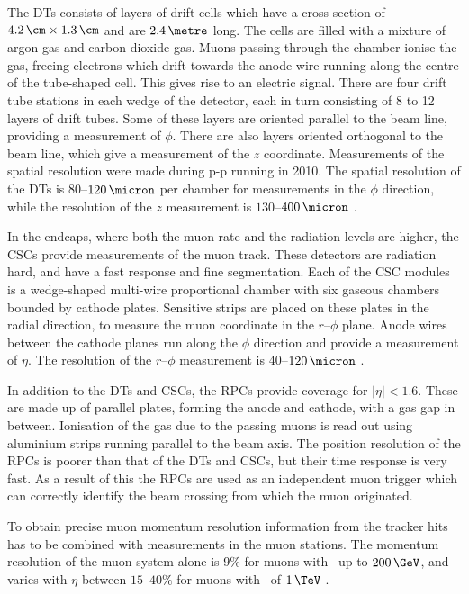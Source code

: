 The \ac{DTs} consists of layers of drift cells which have a cross section of $4.2\,\cm \times 1.3\,\cm$ and
are $2.4\,\metre$ long. The cells are filled with a mixture of %
argon gas and carbon dioxide gas.
Muons passing through the chamber ionise the gas, freeing electrons
which drift towards the anode wire running along the centre of the tube-shaped cell. 
This gives rise to an electric signal. There are four drift tube stations in each wedge of 
the detector, each in turn consisting of 8 to 12 layers of drift tubes. Some of
these layers are oriented parallel to the beam line, providing a measurement of $\phi$.
There are also layers oriented orthogonal to the beam line, which give a measurement
of the $z$ coordinate. Measurements of the spatial resolution were made
during p-p running in 2010.
The spatial resolution of the \ac{DTs} is $80$--$120\,\micron$ per chamber for
measurements in the $\phi$ direction, while the resolution of the $z$ measurement
is $130$--$400\,\micron$ \cite{cms-muon-7tev}. %

In the endcaps, where both the muon rate and the radiation levels are higher, the \ac{CSCs} provide
measurements of the muon track. These detectors are radiation hard,
and have a fast response and fine segmentation.
Each of the CSC modules is a wedge-shaped
multi-wire proportional chamber %
with six gaseous chambers bounded by cathode plates. Sensitive
strips are placed on these plates in the 
radial direction, to measure the muon coordinate in the  $r$--$\phi$ plane.
Anode wires between the cathode planes
run along the $\phi$ direction and provide a measurement of
$\eta$. The resolution of the $r$--$\phi$ measurement is $40$--$120\,\micron$ \cite{cms-muon-7tev}.

In addition to the \ac{DTs} and \ac{CSCs}, the \ac{RPCs} provide coverage
for $|\eta|<1.6$. These are made up of parallel plates, forming the anode and cathode,
with a gas gap in between. Ionisation of the gas due to the passing
muons is read out using aluminium strips running parallel to the 
beam axis. The position resolution of the \ac{RPCs} is poorer than
that of the \ac{DTs} and \ac{CSCs}, but their time response is very fast. As
a result of this the \ac{RPCs} are used as an independent muon trigger
which can correctly identify the beam crossing from which the muon
originated.

To obtain precise muon momentum resolution information from 
the tracker hits has to be combined with measurements in the
muon stations. The momentum resolution of the muon system
alone is 9\% for muons with \pT~up to $200\,\GeV$, and varies with $\eta$ 
between $15$--$40\%$ for muons with \pT~of $1\,\TeV$ \cite{cms-jinst}. %

